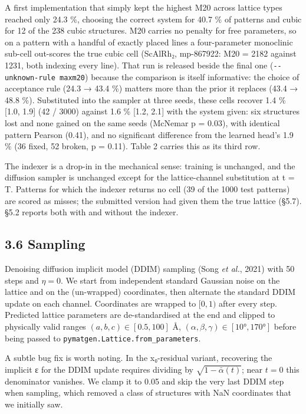 \documentclass[
  11pt,
]{article}
\newcounter{none} %
\begin{document}
A first implementation that simply kept the highest M20 across lattice
types reached only 24.3 \%, choosing the correct system for 40.7 \% of
patterns and cubic for 12 of the 238 cubic structures. M20 carries no
penalty for free parameters, so on a pattern with a handful of exactly
placed lines a four-parameter monoclinic sub-cell out-scores the true
cubic cell (ScAlRh₂, mp-867922: M20 = 2182 against 1231, both indexing
every line). That run is released beside the final one
(\texttt{-\/-unknown-rule\ maxm20}) because the comparison is itself
informative: the choice of acceptance rule (24.3 → 43.4 \%) matters more
than the prior it replaces (43.4 → 48.8 \%). Substituted into the
sampler at three seeds, these cells recover 1.4 \% {[}1.0, 1.9{]} (42 /
3000) against 1.6 \% {[}1.2, 2.1{]} with the system given: six
structures lost and none gained on the same seeds (McNemar p = 0.03),
with identical pattern Pearson (0.41), and no significant difference
from the learned head's 1.9 \% (36 fixed, 52 broken, p = 0.11). Table 2
carries this as its third row.

The indexer is a drop-in in the mechanical sense: training is unchanged,
and the diffusion sampler is unchanged except for the lattice-channel
substitution at t = T. Patterns for which the indexer returns no cell
(39 of the 1000 test patterns) are scored as misses; the submitted
version had given them the true lattice (§5.7). §5.2 reports both with
and without the indexer.

\subsection{3.6 Sampling}\label{sampling}

Denoising diffusion implicit model (DDIM) sampling (Song \emph{et al.},
2021) with 50 steps and \(\eta = 0\). We start from independent standard
Gaussian noise on the lattice and on the (un-wrapped) coordinates, then
alternate the standard DDIM update on each channel. Coordinates are
wrapped to \([0,1)\) after every step. Predicted lattice parameters are
de-standardised at the end and clipped to physically valid ranges
\((a,b,c) \in [0.5, 100]\) Å, \((\alpha,\beta,\gamma) \in [10°, 170°]\)
before being passed to \texttt{pymatgen.Lattice.from\_parameters}.

A subtle bug fix is worth noting. In the x₀-residual variant, recovering
the implicit ε for the DDIM update requires dividing by
\(\sqrt{1-\bar{\alpha}(t)}\); near \(t = 0\) this denominator vanishes.
We clamp it to 0.05 and skip the very last DDIM step when sampling,
which removed a class of structures with NaN coordinates that we
initially saw.
\end{document}
